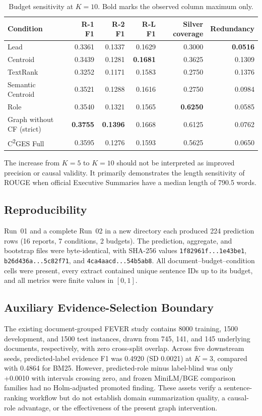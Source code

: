 \documentclass[applsci,article,submit,moreauthors]{Definitions/mdpi}
\newcommand{\cges}{C\textsuperscript{2}GES}
\begin{document}
\begin{table}[H]
\caption{Budget sensitivity at $K=10$. Bold marks the observed column maximum only.}
\label{tab:k10}
\centering
\begin{tabular}{lrrrrr}
\toprule
Condition & R-1 F1 & R-2 F1 & R-L F1 & Silver coverage & Redundancy\\
\midrule
Lead & 0.3361 & 0.1337 & 0.1629 & 0.3000 & \textbf{0.0516}\\
Centroid & 0.3439 & 0.1281 & \textbf{0.1681} & 0.3625 & 0.1309\\
TextRank & 0.3252 & 0.1171 & 0.1583 & 0.2750 & 0.1376\\
Semantic Centroid & 0.3521 & 0.1288 & 0.1616 & 0.2750 & 0.0984\\
Role & 0.3540 & 0.1321 & 0.1565 & \textbf{0.6250} & 0.0585\\
Graph without CF (strict) & \textbf{0.3755} & \textbf{0.1396} & 0.1668 & 0.6125 & 0.0762\\
\cges{} Full & 0.3595 & 0.1276 & 0.1593 & 0.5625 & 0.0650\\
\bottomrule
\end{tabular}
\end{table}

The increase from $K=5$ to $K=10$ should not be interpreted as improved precision or causal validity. It primarily demonstrates the length sensitivity of ROUGE when official Executive Summaries have a median length of 790.5 words.

\subsection{Reproducibility}

Run~01 and a complete Run~02 in a new directory each produced 224 prediction rows (16 reports, 7 conditions, 2 budgets). The prediction, aggregate, and bootstrap files were byte-identical, with SHA-256 values \texttt{1f82961f...1e43be1}, \texttt{b26d436a...5c82f71}, and \texttt{4ca4aacd...54b5ab8}. All document--budget--condition cells were present, every extract contained unique sentence IDs up to its budget, and all metrics were finite values in $[0,1]$.

\subsection{Auxiliary Evidence-Selection Boundary}

The existing document-grouped FEVER study contains 8000 training, 1500 development, and 1500 test instances, drawn from 745, 141, and 145 underlying documents, respectively, with zero cross-split overlap. Across five downstream seeds, predicted-label evidence F1 was 0.4920 (SD 0.0021) at $K=3$, compared with 0.4864 for BM25. However, predicted-role minus label-blind was only +0.0010 with intervals crossing zero, and frozen MiniLM/BGE comparison families had no Holm-adjusted promoted finding. These assets verify a sentence-ranking workflow but do not establish domain summarization quality, a causal-role advantage, or the effectiveness of the present graph intervention.
\end{document}
